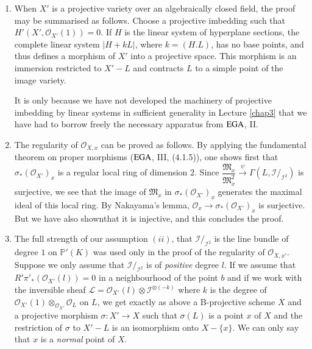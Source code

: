 \begin{remark*}%
\begin{enumerate}
  \item 
   When $X'$ is a projective variety over an algebraically closed
  field, the proof  may be summarised as follows. Choose a projective
  imbedding such that $H' (X' , \mathscr{O}_{X'}(1))=0$. If $H$ is the
  linear system of hyperplane sections, the complete linear system $|
  H + kL|$, where $k=(H.L)$, has no base points, and thus defines a
  morphism of $X'$ into a projective space. This morphism is an
  immersion restricted to  $X' - L$ and contracts $L$ to a simple
  point of the image variety. 
 
  It is only because we have not developed the machinery of projective
  imbedding by linear systems in sufficient generality in Lecture \ref{chap3}
  that we have had to borrow freely the necessary apparatus from $\operatorname{EGA}$,
  II. 
 
  \item The regularity of $\mathscr{O}_{X,x}$ can be proved as follows.
    By applying the fundamental theorem on proper morphisms ($\operatorname{EGA}$, III,
    (4.1.5)), one shows first that $\sigma_*( \mathscr{O}_{X'})_x$ is a
    regular local ring of dimension $2$. Since
    $\dfrac{\mathfrak{M}_x}{\mathfrak{M}^2_x} \overset{\psi}\rightarrow
    \Gamma (L, \mathscr{I}/ _{\mathscr{I}^2})$ is surjective, we see that
    the image  of $\mathfrak{M}_x$ in $\sigma_* (\mathscr{O}_{X'})_x$
    generates the maximal ideal of this local ring. By Nakayama's lemma,
    $\mathscr{O}_x \to \sigma _*(\mathscr{O}_{X'})_x$ is surjective. But we
    have also shown\pageoriginale that it is injective, and this
    concludes the proof.  
    
  \item The full strength of our assumption $(ii)$, that  $\mathscr{I}/
    _{\mathscr{I}^2}$ is the line bundle of degree $1$ on $\mathbb{P}'
    (K)$ was used only in the proof of the regularity of
    $\mathscr{O}_{X,x'}$. Suppose  we only assume that  $\mathscr{I}/
    _{\mathscr{I}^2}$ is of  {\textit{positive}} degree $l$. If we assume
    that $R' \pi'_*( \mathscr{O}_{X'}(l))=0$ in a neighbourhood of the point
    $b$ and if we work with the inversible sheaf $\mathscr{L}=
    \mathscr{O}_{X'}(l) \otimes \mathscr{I}^{\otimes(-k)}$ where $k$ is
    the degree of $\mathscr{O}_{X'}(1)\otimes_{\mathscr{O}_{X'}}
    \mathscr{O}_L$ on $L$, we get exactly as above a B-projective scheme
    $X$ and a projective  morphism $\sigma : X' \to X$ such that $\sigma
    (L)$ is a point $x$ of $X$ and the restriction of $\sigma $ to $X'
    -L$ is an isomorphism onto $X- \{x\}$. We can only say that $x$ is a
    {\textit{ normal }} point of $X$. 
    

\end{enumerate}
\end{remark*}
